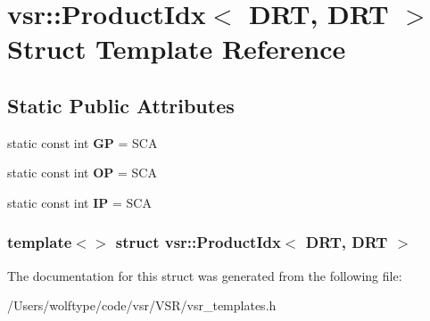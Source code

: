 \hypertarget{structvsr_1_1_product_idx_3_01_d_r_t_00_01_d_r_t_01_4}{\section{vsr\-:\-:Product\-Idx$<$ D\-R\-T, D\-R\-T $>$ Struct Template Reference}
\label{structvsr_1_1_product_idx_3_01_d_r_t_00_01_d_r_t_01_4}
}
\subsection*{Static Public Attributes}
\begin{DoxyCompactItemize}
\item 
\hypertarget{structvsr_1_1_product_idx_3_01_d_r_t_00_01_d_r_t_01_4_aeb4eee8bd5f15990b60e08cf06498942}{static const int {\bfseries G\-P} = S\-C\-A}\label{structvsr_1_1_product_idx_3_01_d_r_t_00_01_d_r_t_01_4_aeb4eee8bd5f15990b60e08cf06498942}

\item 
\hypertarget{structvsr_1_1_product_idx_3_01_d_r_t_00_01_d_r_t_01_4_a37f7df2a1748b9740cff030d2bafdfda}{static const int {\bfseries O\-P} = S\-C\-A}\label{structvsr_1_1_product_idx_3_01_d_r_t_00_01_d_r_t_01_4_a37f7df2a1748b9740cff030d2bafdfda}

\item 
\hypertarget{structvsr_1_1_product_idx_3_01_d_r_t_00_01_d_r_t_01_4_a7c637706360952bf2f74565e960afdef}{static const int {\bfseries I\-P} = S\-C\-A}\label{structvsr_1_1_product_idx_3_01_d_r_t_00_01_d_r_t_01_4_a7c637706360952bf2f74565e960afdef}

\end{DoxyCompactItemize}
\subsubsection*{template$<$$>$ struct vsr\-::\-Product\-Idx$<$ D\-R\-T, D\-R\-T $>$}



The documentation for this struct was generated from the following file\-:\begin{DoxyCompactItemize}
\item 
/\-Users/wolftype/code/vsr/\-V\-S\-R/vsr\-\_\-templates.\-h\end{DoxyCompactItemize}
